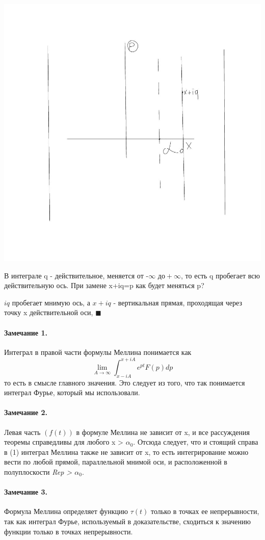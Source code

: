 \documentclass[a4paper, 12pt]{report}
\newenvironment{Proof}
{\par\noindent{\bf Доказательство.}}
{\hfill$\scriptstyle\blacksquare$}
\begin{document}
\begin{Proof}
\begin{center}
    \includegraphics[width=10 cm]{mellin/2.jpg}
\end{center}
\par\bigskip
В интеграле q - действительное, меняется от -{$\infty \text{ до} +\infty$}, то есть q пробегает всю действительную ось. При замене x+iq=p как будет меняться p? 
\par\bigskip
$iq$ пробегает мнимую ось, а $x+iq$ - вертикальная прямая, проходящая через точку x действительной оси,
\end{Proof}

\paragraph{Замечание 1.}
Интеграл в правой части формулы Меллина понимается как $$\lim_{A \to \infty}\int_{x-iA}^{x+iA}e^{pt}F(p)dp$$ то есть в смысле главного значения. Это следует из того, что так понимается интеграл Фурье, который мы использовали.

\paragraph{Замечание 2.}
Левая часть $(f(t))$ в формуле Меллина не зависит от x, и все рассуждения теоремы справедливы для любого x > {$\alpha_0$}. Отсюда следует, что и стоящий справа в (1) интеграл Меллина также не зависит от x, то есть интегрирование можно вести по любой прямой, параллельной мнимой оси, и расположенной в полуплоскости \textsl{Rep > {$\alpha_0$}}.

\paragraph{Замечание 3.}
Формула Меллина определяет функцию {$\tau(t)$} только в точках ее непрерывности, так как интеграл Фурье, используемый в доказательстве, сходиться к значению функции только в точках непрерывности.
\end{document}

